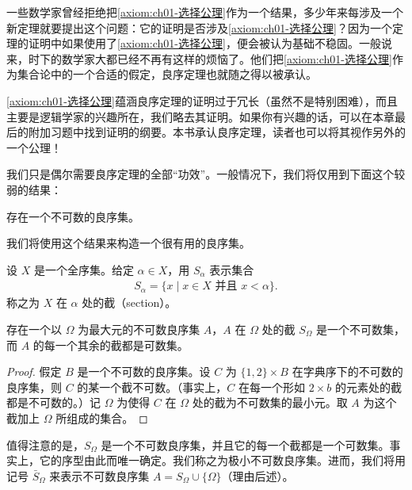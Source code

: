 \documentclass[../../main.tex]{subfiles}
\begin{document}
一些数学家曾经拒绝把\cref{axiom:ch01-选择公理}作为一个结果，多少年来每涉及一个新定理就要提出这个问题：它的证明是否涉及\cref{axiom:ch01-选择公理}？因为一个定理的证明中如果使用了\cref{axiom:ch01-选择公理}，便会被认为基础不稳固。一般说来，时下的数学家大都已经不再有这样的烦恼了。他们把\cref{axiom:ch01-选择公理}作为集合论中的一个合适的假定，良序定理也就随之得以被承认。

\cref{axiom:ch01-选择公理}蕴涵良序定理的证明过于冗长（虽然不是特别困难），而且主要是逻辑学家的兴趣所在，我们略去其证明。如果你有兴趣的话，可以在本章最后的附加习题中找到证明的纲要。本书承认良序定理，读者也可以将其视作另外的一个公理！

我们只是偶尔需要良序定理的全部“功效”。一般情况下，我们将仅用到下面这个较弱的结果：

\begin{corollary}[存在不可数良序集]\label{corollary:ch01-不可数良序}
存在一个不可数的良序集。
\end{corollary}

我们将使用这个结果来构造一个很有用的良序集。

\begin{definition}[截]\label{definition:ch01-截}
设 $X$ 是一个全序集。给定 $\alpha \in X$，用 $S_{\alpha}$ 表示集合
\begin{align*}
S_{\alpha} = \{x \mid x \in X \text{ 并且 } x < \alpha\}.
\end{align*}
称之为 $X$ 在 $\alpha$ 处的截（section）。
\end{definition}

\begin{lemma}[极小不可数良序集]\label{lemma:ch01-极小不可数}
存在一个以 $\Omega$ 为最大元的不可数良序集 $A$，$A$ 在 $\Omega$ 处的截 $S_{\Omega}$ 是一个不可数集，而 $A$ 的每一个其余的截都是可数集。
\end{lemma}

\begin{proof}
假定 $B$ 是一个不可数的良序集。设 $C$ 为 $\{1, 2\} \times B$ 在字典序下的不可数的良序集，则 $C$ 的某一个截不可数。（事实上，$C$ 在每一个形如 $2 \times b$ 的元素处的截都是不可数的。）记 $\Omega$ 为使得 $C$ 在 $\Omega$ 处的截为不可数集的最小元。取 $A$ 为这个截加上 $\Omega$ 所组成的集合。
\end{proof}

值得注意的是，$S_{\Omega}$ 是一个不可数良序集，并且它的每一个截都是一个可数集。事实上，它的序型由此而唯一确定。我们称之为极小不可数良序集。进而，我们将用记号 $\bar{S}_{\Omega}$ 来表示不可数良序集 $A = S_{\Omega} \cup \{\Omega\}$（理由后述）。
\end{document}
